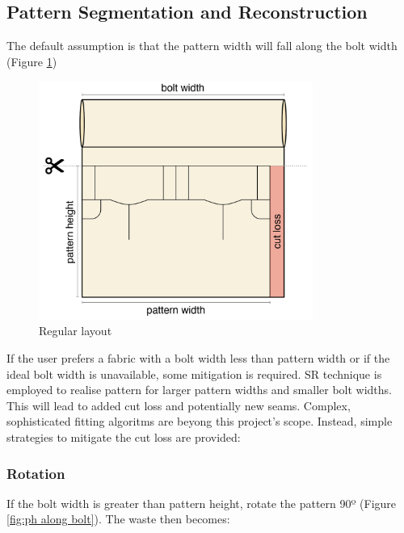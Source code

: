 \subsection{Pattern Segmentation and Reconstruction}
The default assumption is that the pattern width will fall along the bolt width (Figure \ref{fig:pw along bolt})
\begin{figure} [htb]
    \centering 
    \includegraphics[width = 0.8\textwidth]{Images/regular layout.png}
    \caption{Regular layout}
    \label{fig:pw along bolt}
\end{figure}

If the user prefers a fabric with a bolt width less than pattern width or if the ideal bolt width is unavailable, some mitigation is required. SR technique is employed to realise pattern for larger pattern widths and smaller bolt widths. This will lead to added cut loss and potentially new seams. Complex, sophisticated fitting algoritms are beyong this project's scope. Instead, simple strategies to mitigate the cut loss are provided:

\subsubsection{Rotation}
If the bolt width is greater than pattern height, rotate the pattern 90º (Figure \ref{fig:ph along bolt}).
The waste then becomes:

